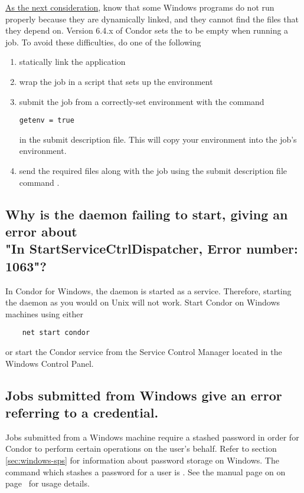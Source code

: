\underline{As the next consideration},
know that 
some Windows programs do not run properly because they are dynamically linked,
and they cannot find the  files that they depend on.
Version 6.4.x of Condor sets the  to be empty when
running a job.
To avoid these difficulties, do one of the following
\begin{enumerate}
\item statically link the application
\item wrap the job in a script that sets up the environment
\item submit the job from a correctly-set environment with the command
\begin{verbatim}
getenv = true
\end{verbatim}
in the submit description file.
This will copy your environment into the job's environment.
\item send the required  files along with the job
using the submit description file command .
\end{enumerate}


\subsection*{Why is the  daemon failing to start, giving an error about\\
   	"In StartServiceCtrlDispatcher, Error number: 1063"?}
In Condor for Windows, the  daemon is started as a service.
Therefore,
starting the  daemon as you would on Unix will not work.
Start Condor on Windows machines using either
\begin{verbatim}
	net start condor
\end{verbatim}
or start the Condor service from the Service Control Manager located in
the Windows Control Panel.

\subsection*{Jobs submitted from Windows give an error referring to a credential.}

Jobs submitted from a Windows machine require a stashed password in
order for Condor to perform certain operations on the user's behalf.
Refer to section \ref{sec:windows-sps} for information about password
storage on Windows.  The command which stashes a password for a user
is .  See the manual page on on
page~\pageref{man-condor-store-cred} for usage details.


